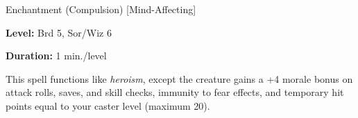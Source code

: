 \label{spell:Greater Heroism}

Enchantment (Compulsion) [Mind-Affecting]

\textbf{Level:} Brd 5, Sor/Wiz 6

\textbf{Duration:} 1 min./level

This spell functions like \textit{heroism}, except the creature gains a +4 morale 
bonus on attack rolls, saves, and skill checks, immunity to fear effects, and temporary 
hit points equal to your caster level (maximum 20).

